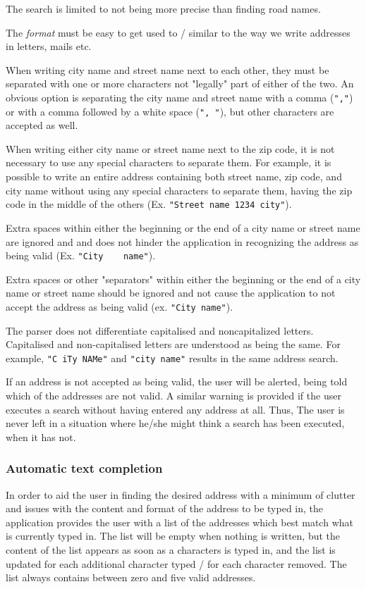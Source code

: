 The search is limited to not being more precise than finding road names.

The \textit{format} must be easy to get used to / similar to the way we write addresses in letters, mails etc.

When writing city name and street name next to each other, they must be separated with one or more characters not "legally" part of either of the two. An obvious option is     separating the city name and street name with a comma (\texttt{","}) or with a comma followed by a white space (\texttt{", "}), but other characters are accepted as well.


When writing either city name or street name next to the zip code, it is not necessary to use any special characters to separate them. For example, it is possible to write     an entire address containing both street name, zip code, and city name without using any special characters to separate them, having the zip code in the middle of the others     (Ex. \texttt{"Street name 1234 city"}).

Extra spaces within either the beginning or the end of a city name or street name are ignored and and does not hinder the application in recognizing the address as being valid (Ex. \texttt{"City\ \ \ \ name"}).

Extra spaces or other "separators" within either the beginning or the end of a city name or street name should be ignored and not cause the application to not accept the address as being valid (ex. \texttt{"City name"}).

The parser does not differentiate capitalised and noncapitalized letters. Capitalised and non-capitalised letters are understood as being the same. For example, \texttt{"C    iTy NAMe"} and \texttt{"city name"} results in the same address search.

If an address is not accepted as being valid, the user will be alerted, being told which of the addresses are not valid. A similar warning is provided if the user executes     a search without having entered any address at all. Thus, The user is never left in a situation where he/she might think a search has been executed, when it has not.

\subsubsection{Automatic text completion}
In order to aid the user in finding the desired address with a minimum of clutter and issues with the content and format of the address to be typed in, the application provides the user with a list of the addresses which best match what is currently typed in. The list will be empty when nothing is written, but the content of the list appears as soon as a characters is typed in, and the list is updated for each additional character typed / for each character removed. The list always contains between zero and five valid addresses.

